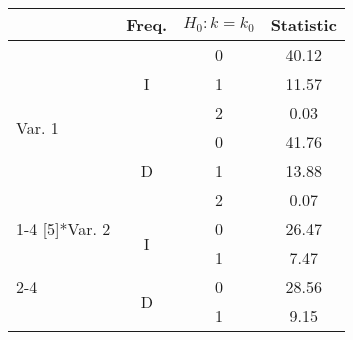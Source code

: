 \documentclass[a4paper,12pt]{article}
\begin{document}
	\newcommand{\Title}{Title of Table}
	\begin{footnotesize}
		\begin{table}[tbph]
			\centering
			\iftoggle{longnotes}{ \caption{\Title} }{ \caption*{\Title} } \label{tab:extabself}
			\begin{threeparttable}
				\begin{tabular}{lccc}
					\toprule
					& Freq. & \(H_{0}: k = k_{0}\) & Statistic \\
					\midrule
					\multirow{6}[5]{*}{Var. 1} & \multirow{3}{*}{I} & 0 & 40.12 \\
					& & 1 & 11.57 \\
					& & 2 &  0.03 \\
					\cmidrule(lr){2-4}
					& \multirow{3}{*}{D} & 0 & 41.76 \\
					& & 1 & 13.88 \\
					& & 2 &  0.07 \\
					\cmidrule(lr){1-4}
					\multirow{4}[5]{*}{Var. 2} & \multirow{2}{*}{I} & 0 & 26.47 \\
					& & 1 &  7.47 \\
					\cmidrule(lr){2-4}
					& \multirow{2}{*}{D} & 0 & 28.56 \\
					& & 1 &  9.15 \\
					\bottomrule
				\end{tabular}
			\end{threeparttable}
		\end{table}
	\end{footnotesize}
\end{document}
